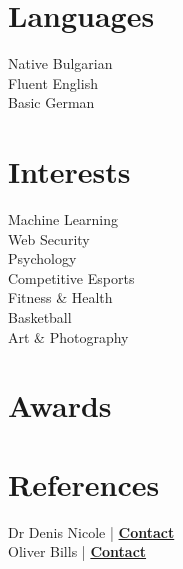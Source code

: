 \documentclass[]{resume}
\begin{document}
\begin{minipage}[t]{0.30\textwidth}
\sectionsep

\section{Languages}
Native Bulgarian\\
Fluent English\\
Basic German

\sectionsep

\section{Interests}

Machine Learning\\
Web Security\\
Psychology\\
Competitive Esports\\
Fitness \& Health\\
Basketball\\
Art \& Photography

\sectionsep
\section{Awards}


\sectionsep
\section{References}

Dr Denis Nicole | \href{http://www.hpcc.ecs.soton.ac.uk/dan/}{\bf Contact}\\
Oliver Bills | \href{https://www.ecs.soton.ac.uk/people/ob1a12}{\bf Contact}



\end{minipage}
\end{document}
